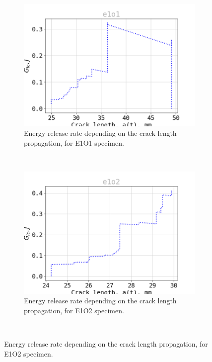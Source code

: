 \begin{figure}[H]
\centering
\begin{subfigure}{0.48\linewidth}
	\centering
	\includegraphics[scale=0.3]{Figures/e1o1_G}
	\decoRule
	\caption[Energy release rate E1O1]{Energy release rate depending on the crack length propagation, for E1O1 specimen.}
	\label{fig:E1O1_G}
\end{subfigure}
\hfill\\
\begin{subfigure}{0.48\linewidth}
	\centering
	\includegraphics[scale=0.3]{Figures/e1o2_G}
	\decoRule
	\caption[Energy release rate E1O2]{Energy release rate depending on the crack length propagation, for E1O2 specimen.}
	\label{fig:E1O2_G}
\end{subfigure}
\hfill\\

\end{figure}
